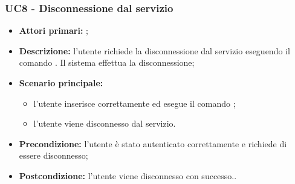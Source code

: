 \subsubsection{UC8 - Disconnessione dal servizio}
\begin{itemize}
	\item \textbf{Attori primari:} \ua{};
	\item \textbf{Descrizione:} l’utente richiede la disconnessione dal servizio eseguendo il comando \logout{}. Il sistema effettua la disconnessione; 
	\item \textbf{Scenario principale:} 
	\begin{itemize}
		\item l'utente inserisce correttamente ed esegue il comando \logout{}; 
		\item l'utente viene disconnesso dal servizio. 
	\end{itemize}
	\item \textbf{Precondizione:} l’utente è stato autenticato correttamente e richiede di essere disconnesso; 
	\item \textbf{Postcondizione:} l’utente viene disconnesso con successo..
\end{itemize}